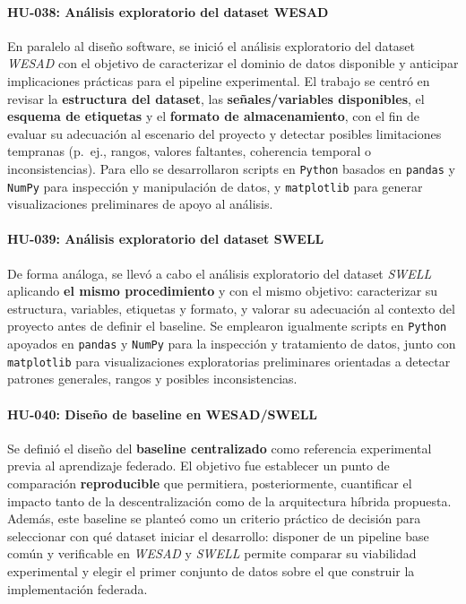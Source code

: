 \documentclass{report}
\begin{document}
\paragraph{HU-038: Análisis exploratorio del dataset WESAD}
En paralelo al diseño software, se inició el análisis exploratorio del dataset \textit{WESAD} con el objetivo de caracterizar el dominio de datos disponible y anticipar implicaciones prácticas para el pipeline experimental. El trabajo se centró en revisar la \textbf{estructura del dataset}, las \textbf{señales/variables disponibles}, el \textbf{esquema de etiquetas} y el \textbf{formato de almacenamiento}, con el fin de evaluar su adecuación al escenario del proyecto y detectar posibles limitaciones tempranas (p.\ ej., rangos, valores faltantes, coherencia temporal o inconsistencias). Para ello se desarrollaron scripts en \texttt{Python} basados en \texttt{pandas} y \texttt{NumPy} para inspección y manipulación de datos, y \texttt{matplotlib} para generar visualizaciones preliminares de apoyo al análisis.

\paragraph{HU-039: Análisis exploratorio del dataset SWELL}
De forma análoga, se llevó a cabo el análisis exploratorio del dataset \textit{SWELL} aplicando \textbf{el mismo procedimiento} y con el mismo objetivo: caracterizar su estructura, variables, etiquetas y formato, y valorar su adecuación al contexto del proyecto antes de definir el baseline. Se emplearon igualmente scripts en \texttt{Python} apoyados en \texttt{pandas} y \texttt{NumPy} para la inspección y tratamiento de datos, junto con \texttt{matplotlib} para visualizaciones exploratorias preliminares orientadas a detectar patrones generales, rangos y posibles inconsistencias.


\paragraph{HU-040: Diseño de baseline en WESAD/SWELL}
Se definió el diseño del \textbf{baseline centralizado} como referencia experimental previa al aprendizaje federado. El objetivo fue establecer un punto de comparación \textbf{reproducible} que permitiera, posteriormente, cuantificar el impacto tanto de la descentralización como de la arquitectura híbrida propuesta. Además, este baseline se planteó como un criterio práctico de decisión para seleccionar con qué dataset iniciar el desarrollo: disponer de un pipeline base común y verificable en \textit{WESAD} y \textit{SWELL} permite comparar su viabilidad experimental y elegir el primer conjunto de datos sobre el que construir la implementación federada.
\end{document}
